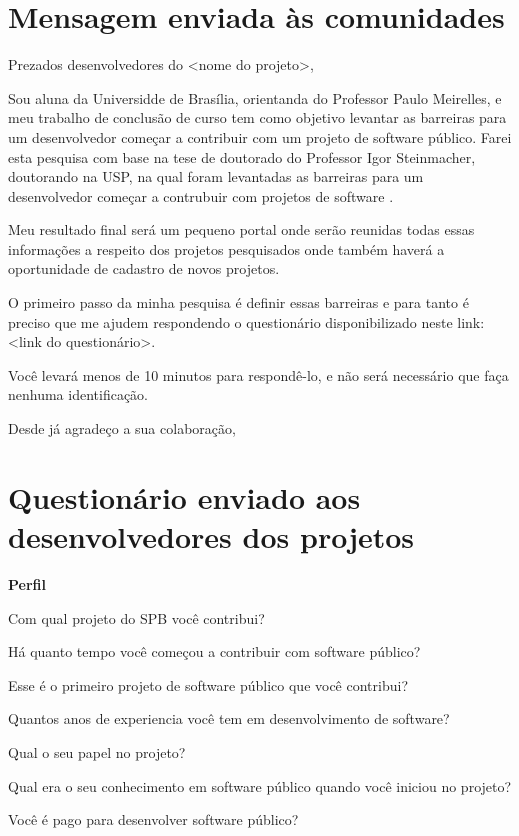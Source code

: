 \begin{anexosenv}

\partanexos

\chapter{Mensagem enviada às comunidades}
\label{anexo a}

Prezados desenvolvedores do <nome do projeto>,

Sou aluna da Universidde de Brasília, orientanda do Professor
Paulo Meirelles, e meu trabalho de conclusão de curso tem como 
objetivo levantar as barreiras para um desenvolvedor 
começar a contribuir com um projeto de software público. Farei esta pesquisa 
com base na tese de doutorado do Professor Igor Steinmacher, doutorando na USP,
na qual foram levantadas as barreiras para um desenvolvedor começar a contrubuir 
com projetos de software .

Meu resultado final será um pequeno portal onde serão reunidas todas essas informações
a respeito dos projetos pesquisados onde também haverá a oportunidade de cadastro de
novos projetos.

O primeiro passo da minha pesquisa é definir essas barreiras e para tanto é
preciso que me ajudem respondendo o questionário disponibilizado neste link:
<link do questionário>.

Você levará menos de 10 minutos para respondê-lo, e não será necessário que faça
nenhuma identificação.

Desde já agradeço a sua colaboração,

\chapter{Questionário enviado aos desenvolvedores dos projetos}
\label{anexo b}

\textbf{Perfil}

Com qual projeto do SPB você contribui?

Há quanto tempo você começou a contribuir com software público?

Esse é o primeiro projeto de software público que você contribui?

Quantos anos de experiencia você tem em desenvolvimento de software?

Qual o seu papel no projeto?

Qual era o seu conhecimento em software público quando você iniciou no projeto?

Você é pago para desenvolver software público?


\end{anexosenv}
